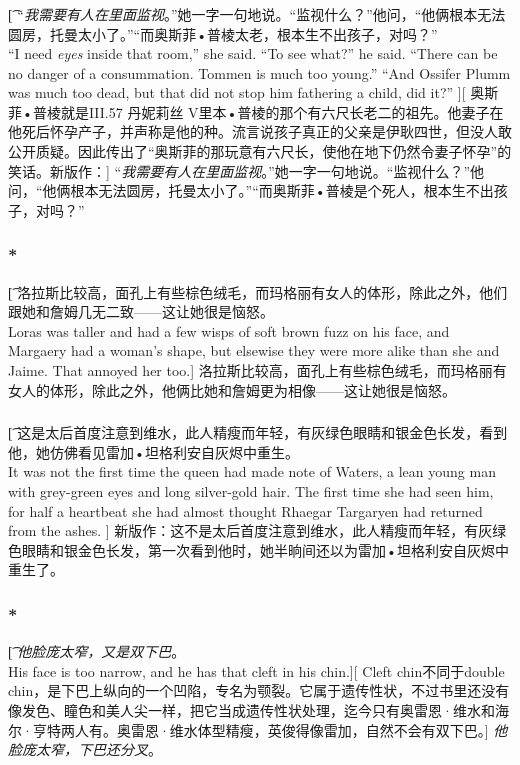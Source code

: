 \documentclass[12pt,a4paper]{article}
\begin{document}
\subsubsection{}\label{4.12.1}\t[
	“\emph{我需要有人在里面监视}。”她一字一句地说。“监视什么？”他问，“他俩根本无法圆房，托曼太小了。”“而奥斯菲•普棱太老，根本生不出孩子，对吗？” \\
	“I need \emph{eyes} inside that room,” she said. “To see what?” he said. “There can be no danger of a consummation. Tommen is much too young.” “And Ossifer Plumm was much too dead, but that did not stop him fathering a child, did it?” ][
	奥斯菲•普棱就是III.57 丹妮莉丝 V里本•普棱的那个有六尺长老二的祖先。他妻子在他死后怀孕产子，并声称是他的种。流言说孩子真正的父亲是伊耿四世，但没人敢公开质疑。因此传出了“奥斯菲的那玩意有六尺长，使他在地下仍然令妻子怀孕”的笑话。新版作：]
	“\emph{我需要有人在里面监视}。”她一字一句地说。“监视什么？”他问，“他俩根本无法圆房，托曼太小了。”“而奥斯菲•普棱是个死人，根本生不出孩子，对吗？” 
	
\subsubsection{\color{red}*}\t[
	洛拉斯比较高，面孔上有些棕色绒毛，而玛格丽有女人的体形，除此之外，他们跟她和詹姆几无二致——这让她很是恼怒。\\
	Loras was taller and had a few wisps of soft brown fuzz on his face, and Margaery had a woman's shape, but elsewise they were more alike than she and Jaime. That annoyed her too.]
	洛拉斯比较高，面孔上有些棕色绒毛，而玛格丽有女人的体形，除此之外，他俩比她和詹姆更为相像——这让她很是恼怒。
	
\subsubsection{}\t[
	这是太后首度注意到维水，此人精瘦而年轻，有灰绿色眼睛和银金色长发，看到他，她仿佛看见雷加•坦格利安自灰烬中重生。\\
	It was not the first time the queen had made note of Waters, a lean young man with grey-green eyes and long silver-gold hair. The first time she had seen him, for half a heartbeat she had almost thought Rhaegar Targaryen had returned from the ashes. ]
	新版作：这不是太后首度注意到维水，此人精瘦而年轻，有灰绿色眼睛和银金色长发，第一次看到他时，她半晌间还以为雷加•坦格利安自灰烬中重生了。
	
\subsubsection{\color{red}*}\label{4.12.4}\t[	
	\emph{他脸庞太窄，又是双下巴}。\\
	His face is too narrow, and he has that cleft in his chin.][
	Cleft chin不同于double chin，是下巴上纵向的一个凹陷，专名为颚裂。它属于遗传性状，不过书里还没有像发色、瞳色和美人尖一样，把它当成遗传性状处理，迄今只有奥雷恩·维水和海尔·亨特两人有。奥雷恩·维水体型精瘦，英俊得像雷加，自然不会有双下巴。]
	\emph{他脸庞太窄，下巴还分叉}。
	
\end{document}
